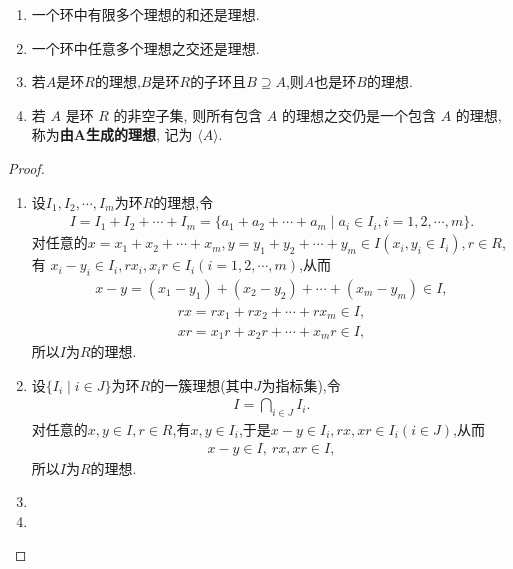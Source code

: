 \documentclass[../../main.tex]{subfiles}%
\begin{document}
\begin{theorem}\label{theorem:子环和理想的基本性质}
\begin{enumerate}[(1)]
\item 一个环中有限多个理想的和还是理想.

\item 一个环中任意多个理想之交还是理想.

\item\label{theorem:子环和理想的基本性质-2} 若$A$是环$R$的理想,$B$是环$R$的子环且$B\supseteq A$,则$A$也是环$B$的理想.

\item 若 \( A \) 是环 \( R \) 的非空子集, 则所有包含 \( A \) 的理想之交仍是一个包含 \( A \) 的理想, 称为\textbf{由\(\boldsymbol{A}\)生成的理想}, 记为 \( \langle A \rangle \).
\end{enumerate}
\end{theorem}
\begin{proof}
\begin{enumerate}[(1)]
\item 设$I_1,I_2,\cdots,I_m$为环$R$的理想,令
\begin{align*}
I = I_1 + I_2 + \cdots + I_m = \{a_1 + a_2 + \cdots + a_m \mid a_i \in I_i, i=1,2,\cdots,m\}.
\end{align*}
对任意的$x = x_1 + x_2 + \cdots + x_m, y = y_1 + y_2 + \cdots + y_m \in I(x_i,y_i \in I_i), r \in R$,有
$x_i - y_i \in I_i, rx_i, x_i r \in I_i(i=1,2,\cdots,m)$,从而
\begin{align*}
x - y = (x_1 - y_1) + (x_2 - y_2) + \cdots + (x_m - y_m) \in I,
\end{align*}
\begin{align*}
rx = rx_1 + rx_2 + \cdots + rx_m \in I,
\end{align*}
\begin{align*}
xr = x_1 r + x_2 r + \cdots + x_m r \in I,
\end{align*}
所以$I$为$R$的理想.

\item 设$\{I_i \mid i \in J\}$为环$R$的一簇理想(其中$J$为指标集),令
\begin{align*}
I = \bigcap_{i \in J}I_i.
\end{align*}
对任意的$x,y \in I, r \in R$,有$x,y \in I_i$,于是$x - y \in I_i, rx,xr \in I_i(i \in J)$,从而
\begin{align*}
x - y \in I,\ rx,xr \in I,
\end{align*}
所以$I$为$R$的理想.

\item 

\item 
\end{enumerate}

\end{proof}
\end{document}
